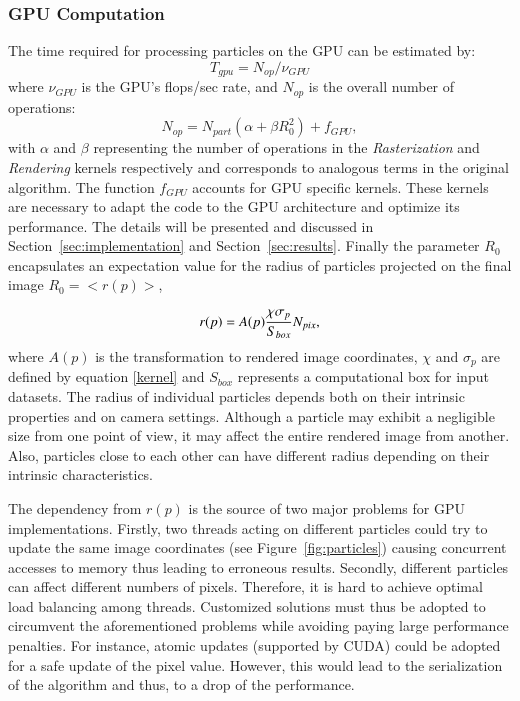 \documentclass[1p]{elsarticle}
\begin{document}
\subsubsection{GPU Computation}
The time required for processing particles on the GPU can be estimated by:
\begin{equation}
T_{gpu} = N_{op}/\nu_{GPU}
\end{equation}
where $\nu_{GPU}$ is the GPU's flops/sec rate, and $N_{op}$ is the overall number of operations:
\begin{equation}\label{ops}
N_{op} = N_{part}(\alpha + \beta R_0^2) + f_{GPU},
\end{equation}
with $\alpha$ and $\beta$ representing the number of operations in the \textit{Rasterization} and \textit{Rendering} kernels respectively
and corresponds to analogous terms in the original algorithm. 
The function $f_{GPU}$ accounts for GPU specific kernels. 
These kernels are necessary to adapt the code to the GPU architecture and optimize its performance.
The details will be presented and discussed in Section~\ref{sec:implementation} and Section~\ref{sec:results}.
Finally the parameter $R_0$ encapsulates an expectation value for the radius of particles projected on the final image $R_0 = <r(p)>$,

\begin{equation}\label{radius}
r(p) = A(p){\chi \sigma_p\over S_{box}} N_{pix},
\end{equation} 
where $A(p)$ is the transformation to rendered image coordinates, $\chi$ and $\sigma_p$ are defined by equation \eqref{kernel} and $S_{box}$ represents a computational box for input datasets. 
The radius of individual particles depends both on their intrinsic properties and on camera settings. Although a particle may exhibit a negligible size from one point of view, it may affect the entire rendered image from another. Also, particles close to each other can have different radius depending on their intrinsic characteristics.

The dependency from $r(p)$ is the source of two major problems for GPU implementations. Firstly, two threads acting on different particles could try 
to update the same image coordinates (see Figure~\ref{fig:particles}) causing concurrent accesses to memory thus leading to erroneous results. 
Secondly, different particles can affect different numbers of pixels. Therefore, it is hard to achieve optimal load balancing among threads.  
Customized solutions must thus be adopted to circumvent the aforementioned problems while avoiding paying large performance penalties. For instance, atomic updates (supported by CUDA) could be adopted for a safe update of the pixel value. However, this would lead to the serialization of the algorithm and thus, to a drop of the performance. 
\end{document}
